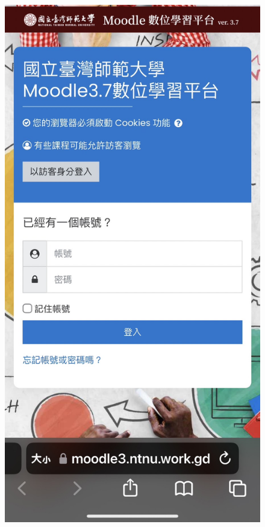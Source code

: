 \documentclass[a4paper,12pt]{article}
\begin{document}
\begin{figure}[ht!]
    \centering
    \begin{minipage}{0.45\textwidth}
        \centering
        \includegraphics[width=\textwidth]{phone_fake.jpg}

\end{minipage}
\end{figure}
\end{document}
